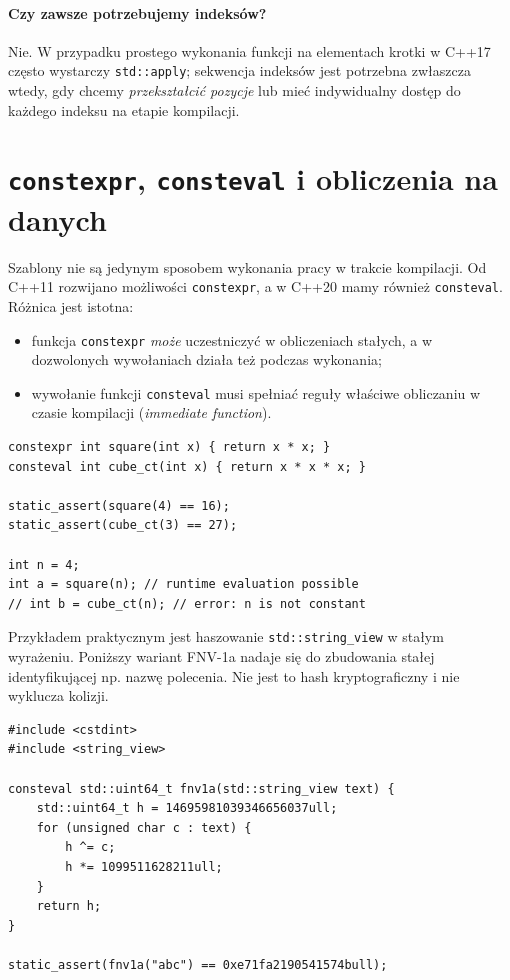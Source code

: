 \paragraph{Czy zawsze potrzebujemy indeksów?}
Nie. W przypadku prostego wykonania funkcji na elementach krotki
w C++17 często wystarczy \texttt{std::apply}; sekwencja indeksów
jest potrzebna zwłaszcza wtedy, gdy chcemy \emph{przekształcić pozycje}
lub mieć indywidualny dostęp do każdego indeksu na etapie kompilacji.

\section{\texttt{constexpr}, \texttt{consteval} i obliczenia na danych}
\label{sec:cpp9-constant-eval}

Szablony nie są jedynym sposobem wykonania pracy w trakcie kompilacji.
Od C++11 rozwijano możliwości \texttt{constexpr}, a w C++20 mamy
również \texttt{consteval}. Różnica jest istotna:
\begin{itemize}
\item funkcja \texttt{constexpr} \emph{może} uczestniczyć w obliczeniach
stałych, a w dozwolonych wywołaniach działa też podczas wykonania;
\item wywołanie funkcji \texttt{consteval} musi spełniać reguły
właściwe obliczaniu w czasie kompilacji (\textit{immediate function}).
\end{itemize}

\begin{lstlisting}
constexpr int square(int x) { return x * x; }
consteval int cube_ct(int x) { return x * x * x; }

static_assert(square(4) == 16);
static_assert(cube_ct(3) == 27);

int n = 4;
int a = square(n); // runtime evaluation possible
// int b = cube_ct(n); // error: n is not constant
\end{lstlisting}

Przykładem praktycznym jest haszowanie \texttt{std::string\_view}
w stałym wyrażeniu. Poniższy wariant FNV-1a nadaje się do zbudowania
stałej identyfikującej np. nazwę polecenia. Nie jest to hash
kryptograficzny i nie wyklucza kolizji.

\begin{lstlisting}
#include <cstdint>
#include <string_view>

consteval std::uint64_t fnv1a(std::string_view text) {
    std::uint64_t h = 14695981039346656037ull;
    for (unsigned char c : text) {
        h ^= c;
        h *= 1099511628211ull;
    }
    return h;
}

static_assert(fnv1a("abc") == 0xe71fa2190541574bull);
\end{lstlisting}


